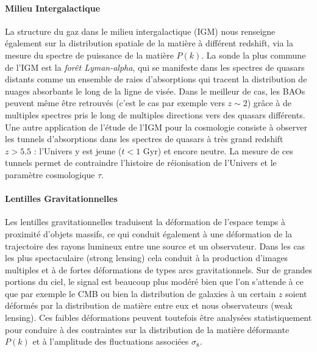 \paragraph{Milieu Intergalactique}
La structure du gaz dans le milieu intergalactique (IGM) nous renseigne également sur la distribution spatiale de la matière à différent redshift, via la mesure du spectre de puissance de la matière $P(k)$. La sonde la plus commune de l'IGM est la \textit{forêt Lyman-alpha}, qui se manifeste dans les spectres de quasars distants comme un ensemble de raies d'absorptions qui tracent la distribution de nuages absorbants le long de la ligne de visée. Dans le meilleur de cas, les BAOs peuvent même être retrouvés (c'est le cas par exemple vers $z\sim2$) grâce à de multiples spectres pris le long de multiples directions vers des quasars différents. Une autre application de l'étude de l'IGM pour la cosmologie consiste à observer les tunnels d'absorptions dans les spectres de quasars à très grand redshift $z>5.5$ : l'Univers y est jeune ($t<1$ Gyr) et encore neutre. La mesure de ces tunnels permet de contraindre l'histoire de réionisation de l'Univers et le paramètre cosmologique $\tau$.

\paragraph{Lentilles Gravitationnelles}
Les lentilles gravitationnelles traduisent la déformation de l'espace temps à proximité d'objets massifs, ce qui conduit également à une déformation de la trajectoire des rayons lumineux entre une source et un observateur. Dans les cas les plus spectaculaire (strong lensing) cela conduit à la production d'images multiples et à de fortes déformations de types arcs gravitationnels. Sur de grandes portions du ciel, le signal est beaucoup plus modéré bien que l'on s'attende à ce que par exemple le CMB ou bien la distribution de galaxies à un certain $z$ soient déformés par la distribution de matière entre eux et nous observateurs (weak lensing). Ces faibles déformations peuvent toutefois être analysées statistiquement pour conduire à des contraintes sur la distribution de la matière déformante $P(k)$ et à l'amplitude des fluctuations associées $\sigma_8$.

